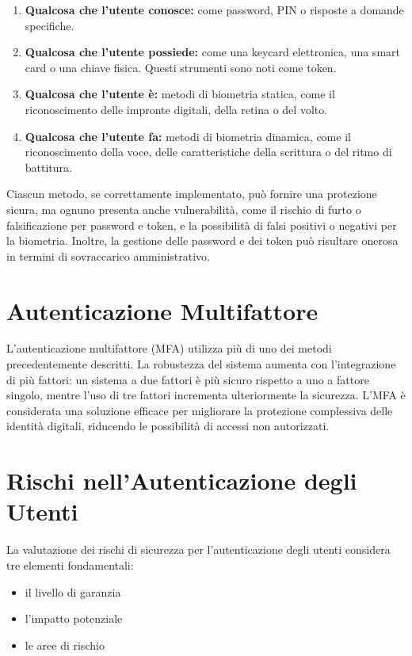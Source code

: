 \begin{enumerate}
    \item \textbf{Qualcosa che l'utente conosce:} come password, PIN o risposte a domande specifiche.
    \item \textbf{Qualcosa che l'utente possiede:} come una keycard elettronica, una smart card o una chiave fisica. Questi strumenti sono noti come token.
    \item \textbf{Qualcosa che l'utente è:} metodi di biometria statica, come il riconoscimento delle impronte digitali, della retina o del volto.
    \item \textbf{Qualcosa che l'utente fa:} metodi di biometria dinamica, come il riconoscimento della voce, delle caratteristiche della scrittura o del ritmo di battitura.
\end{enumerate}

Ciascun metodo, se correttamente implementato, può fornire una protezione sicura, ma ognuno presenta anche vulnerabilità, come il rischio di furto o falsificazione per password e token, e la possibilità di falsi positivi o negativi per la biometria. Inoltre, la gestione delle password e dei token può risultare onerosa in termini di sovraccarico amministrativo.

\section{Autenticazione Multifattore}

L'autenticazione multifattore (MFA) utilizza più di uno dei metodi precedentemente descritti. La robustezza del sistema aumenta con l'integrazione di più fattori: un sistema a due fattori è più sicuro rispetto a uno a fattore singolo, mentre l'uso di tre fattori incrementa ulteriormente la sicurezza. L'MFA è considerata una soluzione efficace per migliorare la protezione complessiva delle identità digitali, riducendo le possibilità di accessi non autorizzati.

\section{Rischi nell'Autenticazione degli Utenti}

La valutazione dei rischi di sicurezza per l'autenticazione degli utenti considera tre elementi fondamentali:

\begin{itemize}
    \item il livello di garanzia
    \item l'impatto potenziale
    \item le aree di rischio
\end{itemize}

